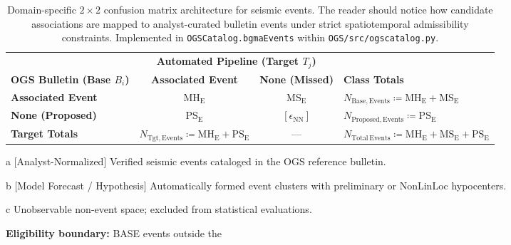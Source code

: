 \begin{landscape}
  \begin{table}[htbp]
    \centering
    \small
    \caption{Domain-specific $2 \times 2$ confusion matrix architecture
      for seismic events. The reader should notice how candidate associations
      are mapped to analyst-curated bulletin events under strict spatiotemporal
      admissibility constraints. Implemented in \texttt{OGSCatalog.bgmaEvents}
    within \texttt{OGS/src/ogscatalog.py}.}
    \label{tab:event_confusion_matrix}
    \begin{threeparttable}
      \begin{tabularx}{\linewidth}{l c c X}
        \toprule
        & \multicolumn{2}{c}{\textbf{Automated Pipeline (Target $T_j$)}} & \\
        \cmidrule(lr){2-3}
        \textbf{\ac{OGS} Bulletin (Base $B_i$)\tnote{a}} &
        \textbf{Associated Event} & \textbf{None (Missed)} &
        \textbf{Class Totals} \\
        \midrule
        \textbf{Associated Event} & $\mathrm{MH}_{\mathrm{E}}$ &
        $\mathrm{MS}_{\mathrm{E}}$ & $N_{\mathrm{Base},
        \mathrm{Events}} \coloneqq \mathrm{MH}_{\mathrm{E}} +
        \mathrm{MS}_{\mathrm{E}}$ \\
        \textbf{None (Proposed)\tnote{b}} & $\mathrm{PS}_{\mathrm{E}}$
        & $[\epsilon_{\mathrm{NN}}]$\tnote{c} & $N_{\mathrm{Proposed},
        \mathrm{Events}} \coloneqq \mathrm{PS}_{\mathrm{E}}$ \\
        \midrule
        \textbf{Target Totals} & $N_{\mathrm{Tgt}, \mathrm{Events}} \coloneqq
        \mathrm{MH}_{\mathrm{E}} + \mathrm{PS}_{\mathrm{E}}$ & --- &
        $N_{\mathrm{Total\,Events}} \coloneqq \mathrm{MH}_{\mathrm{E}} +
        \mathrm{MS}_{\mathrm{E}} + \mathrm{PS}_{\mathrm{E}}$ \\
        \bottomrule
      \end{tabularx}
      \begin{tablenotes}[flushleft]
        \footnotesize
      \item[a] [Analyst-Normalized] Verified seismic events cataloged
        in the \ac{OGS} reference bulletin.
      \item[b] [Model Forecast / Hypothesis] Automatically formed
        event clusters with preliminary or \ac{NonLinLoc} hypocenters.
      \item[c] Unobservable non-event space; excluded from statistical
        evaluations.
      \item \textbf{Eligibility boundary:} BASE events outside the

\end{tablenotes}
\end{threeparttable}
\end{table}
\end{landscape}
